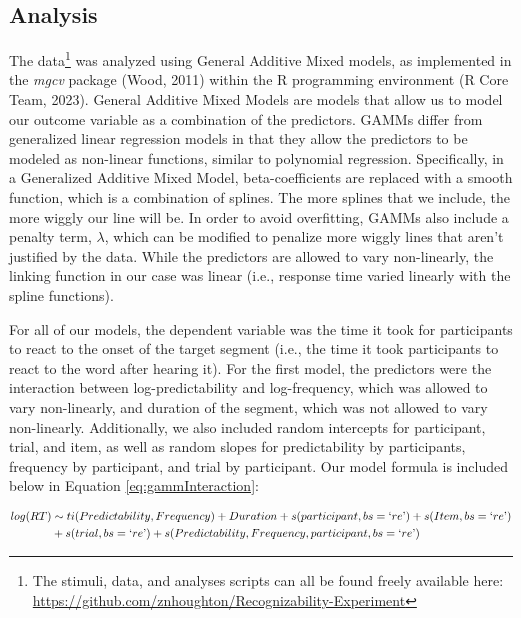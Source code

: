 \documentclass[
  man,floatsintext]{apa6}
\begin{document}
\hypertarget{analysis}{%
\subsection{Analysis}\label{analysis}}

The data\footnote{The stimuli, data, and analyses scripts can all be found freely available here: \url{https://github.com/znhoughton/Recognizability-Experiment}} was analyzed using General Additive Mixed models, as implemented in the \emph{mgcv} package (Wood, 2011) within the R programming environment (R Core Team, 2023). General Additive Mixed Models are models that allow us to model our outcome variable as a combination of the predictors. GAMMs differ from generalized linear regression models in that they allow the predictors to be modeled as non-linear functions, similar to polynomial regression. Specifically, in a Generalized Additive Mixed Model, beta-coefficients are replaced with a smooth function, which is a combination of splines. The more splines that we include, the more wiggly our line will be. In order to avoid overfitting, GAMMs also include a penalty term, \(\lambda\), which can be modified to penalize more wiggly lines that aren't justified by the data. While the predictors are allowed to vary non-linearly, the linking function in our case was linear (i.e., response time varied linearly with the spline functions).

For all of our models, the dependent variable was the time it took for participants to react to the onset of the target segment (i.e., the time it took participants to react to the word after hearing it). For the first model, the predictors were the interaction between log-predictability and log-frequency, which was allowed to vary non-linearly, and duration of the segment, which was not allowed to vary non-linearly. Additionally, we also included random intercepts for participant, trial, and item, as well as random slopes for predictability by participants, frequency by participant, and trial by participant. Our model formula is included below in Equation \eqref{eq:gammInteraction}:

\begin{equation}
\begin{aligned}
\label{eq:gammInteraction}
log(RT) & \sim ti(Predictability, Frequency) + Duration + s(participant, bs = `re\text{'}) + s(Item, bs = `re\text{'}) \\
& + s(trial, bs = `re\text{'}) + s(Predictability, Frequency, participant, bs = `re\text{'}) 
\end{aligned}
\end{equation}
\end{document}
